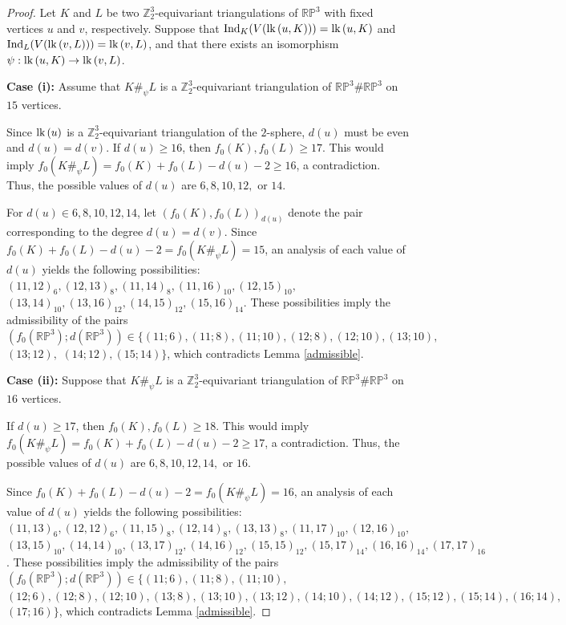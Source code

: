 \documentclass[11pt]{amsart}
\numberwithin{equation}{section}
\theoremstyle{definition}
\newcommand{\lk}{\mbox{\upshape lk}\,}
\def \bb{\mathbb}
\def \ZZ{{\bb{Z}}}
\begin{document}
\begin{proof}

Let $K$ and $L$ be two $\mathbb{Z}_2^3$-equivariant triangulations of $\mathbb{RP}^3$ with fixed vertices $u$ and $v$, respectively. Suppose that $\mathrm{Ind}_K(V(\lk(u,K)))=\lk(u,K)$ and $\mathrm{Ind}_L(V(\lk(v,L)))=\lk(v,L)$, and that there exists an isomorphism $\psi:\lk(u,K)\to\lk(v,L)$.

\textbf{Case (i):}
Assume that $K\#_{\psi}L$ is a $\ZZ_2^3$-equivariant triangulation of $\mathbb{RP}^3\#\mathbb{RP}^3$ on $15$ vertices.

Since $\lk(u)$ is a $\mathbb{Z}_2^3$-equivariant triangulation of the $2$-sphere, $d(u)$ must be even and $d(u)=d(v)$. If $d(u)\geq 16$, then $f_0(K),f_0(L)\geq 17$. This would imply
$f_0(K\#_{\psi}L)=f_0(K)+f_0(L)-d(u)-2\geq 16$,
a contradiction. Thus, the possible values of $d(u)$ are $6,8,10,12,$ or $14$.

For $d(u)\in{6,8,10,12,14}$, let $(f_0(K),f_0(L))_{d(u)}$ denote the pair corresponding to the degree $d(u)=d(v)$. Since
$f_0(K)+f_0(L)-d(u)-2=f_0(K\#_{\psi}L)=15$,
an analysis of each value of $d(u)$ yields the following possibilities:
$(11,12)_6,(12,13)_8,(11,14)_8,(11,16)_{10},(12,15)_{10},$ $(13,14)_{10},(13,16)_{12},(14,15)_{12},(15,16)_{14}$.
These possibilities imply the admissibility of the pairs
$(f_0(\mathbb{RP}^3);d(\mathbb{RP}^3))\in\{(11;6),(11;8),(11;10),(12;8),(12;10),(13;10),$ $(13;12),$ $(14;12),(15;14)\}$,
which contradicts Lemma \ref{admissible}.

\textbf{Case (ii):}
Suppose that $K\#_{\psi}L$ is a $\mathbb{Z}_2^3$-equivariant triangulation of $\mathbb{RP}^3\#\mathbb{RP}^3$ on $16$ vertices.

If $d(u)\geq 17$, then $f_0(K),f_0(L)\geq 18$. This would imply
$f_0(K\#_{\psi}L)=f_0(K)+f_0(L)-d(u)-2\geq 17$,
a contradiction. Thus, the possible values of $d(u)$ are $6,8,10,12,14,$ or $16$.

Since
$f_0(K)+f_0(L)-d(u)-2=f_0(K\#_{\psi}L)=16$,
an analysis of each value of $d(u)$ yields the following possibilities:
$(11,13)_6,(12,12)_6,(11,15)_8,(12,14)_8,(13,13)_8,(11,17)_{10},(12,16)_{10},$ $(13,15)_{10},(14,14)_{10},(13,17)_{12},(14,16)_{12},(15,15)_{12},(15,17)_{14},(16,16)_{14},(17,17)_{16}$.
These possibilities imply the admissibility of the pairs
$(f_0(\mathbb{RP}^3);d(\mathbb{RP}^3))\in\{(11;6),(11;8),(11;10),$ $(12;6),(12;8),(12;10),(13;8),(13;10),(13;12),(14;10),(14;12),(15;12),(15;14),(16;14),$ \\ $(17;16)\}$,
which contradicts Lemma \ref{admissible}.
\end{proof}
 
\end{document}

